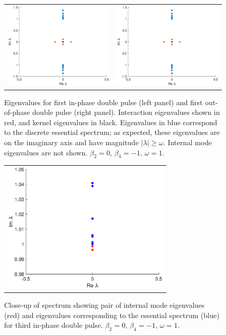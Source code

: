 \documentclass[12pt]{article}
\begin{document}
\begin{figure}[H]
\centering
\begin{tabular}{cc}
\includegraphics[width=8cm]{images/inteigsDP1plus.eps} &
\includegraphics[width=8cm]{images/inteigsDP1plus.eps}
\end{tabular}
\caption{Eigenvalues for first in-phase double pulse (left panel) and first out-of-phase double pulse (right panel). Interaction eigenvalues shown in red, and kernel eigenvalues in black. Eigenvalues in blue correspond to the discrete essential spectrum; as expected, these eigenvalues are on the imaginary axis and have magnitude $|\lambda| \geq \omega$. Internal mode eigenvalues are not shown. $\beta_2 = 0$, $\beta_4 = -1$, $\omega = 1$.}
\label{fig:doublespec}
\end{figure} 

\begin{figure}[H]
\centering
\begin{tabular}{c}
\includegraphics[width=8cm]{images/DP3internalmode.eps}
\end{tabular}
\caption{Close-up of spectrum showing pair of internal mode eigenvalues (red) and eigenvalues corresponding to the essential spectrum (blue) for third in-phase double pulse. $\beta_2 = 0$, $\beta_4 = -1$, $\omega = 1$.}
\label{fig:doubleinternalmode}
\end{figure} 
\end{document}
